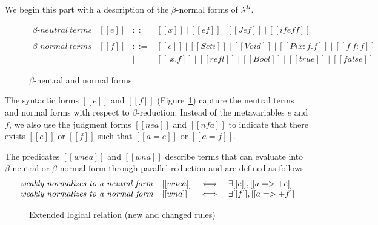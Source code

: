 \documentclass[\ifpublic nolinenum\else\fi,online,OA]{jfp}
\newcommand{\scw}[1]{}
\newcommand{\yl}[1]{}
\newcommand{\dotv}[2]{\href{#1}{\texttt{#1}}{\texttt{:#2}}}
\newcommand{\lang}{$\lambda^{\Pi}$\xspace}
\theoremstyle{definition}
\begin{document}
We begin this part with a description of the $\beta$-normal forms
of \lang{}.
%
\begin{figure}
  \[
    \begin{array}{llcl}
       \beta\text{-}\mathit{neutral\ terms} &
      [[e]] & ::= & [[x]]\ |\ [[e f]]\ |\ [[J e f]]\ |\ [[if e f
                    f]] \\ \\
      \beta\text{-}\mathit{normal\ terms} &
      [[f]] & ::= & [[e]]\ |\ [[Set i]]\ |\ [[Void]]\ |\ [[Pi x : f . f]]\
                    |\ [[f ~ f : f]]\\
            & & |   & [[\ x . f]]\ |\ [[refl]]\ |\ [[Bool]]\ |\ [[true]]\ |\ [[false]]
    \end{array}
  \]
  \caption{$\beta$-neutral and normal forms}
  \label{fig:nenf}
\end{figure}
%
The syntactic forms $[[e]]$ and $[[f]]$ (Figure~\ref{fig:nenf}) capture the
neutral terms and normal forms with respect to $\beta$-reduction\scw{Why not say parallel reduction here? We can be specific and say that that the only reductions available for these terms are identity reductions and cite
\footnote{\dotv{normalform.v}{nf\_refl}} }.\yl{I always think of
normal form as the specific definition that says the relation can't
step. We can refer to nfrefl but that requires some explanation about
the definition of normal form and the complication that it doesn't
hold in $\eta$ (maybe it's fine if we just don't mention it in the
$\eta$ case)}\scw{A terminal form is a syntactic characterization of terms that don't step 
according to a particular relation. A normal form is a terminal form of a normalizing relation.}
 Instead of the
metavariables $e$ and $f$, we also
use the judgment forms $[[ne a]]$ and $[[nf a]]$ to indicate that there exists
$[[e]]$ or $[[f]]$ such that $[[a = e]]$ or $[[a = f]]$.

The predicates $[[wne a]]$ and $[[wn
a]]$ describe terms that can evaluate into $\beta$-neutral or
$\beta$-normal form through parallel reduction and are defined as
follows.
\[
\begin{array}{llcl}
\mbox{\emph{weakly normalizes to a neutral form}} & [[wne a]] &\iff& \exists [[e]], [[a =>+ e]] \\
\mbox{\emph{weakly normalizes to a normal form}}  & [[wn a]]  &\iff& \exists [[f]], [[a =>+ f]] \\
\end{array}
\]

\begin{figure}[H]
  \caption{Extended logical relation (new and changed rules) }
  \label{fig:logrelopen}
\end{figure}
\end{document}
